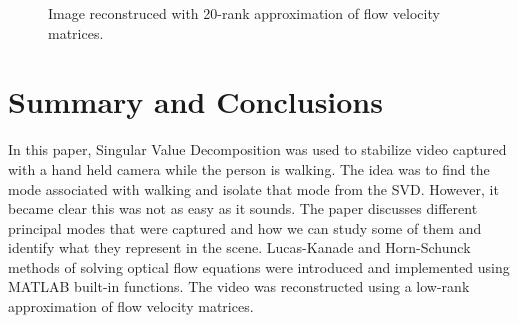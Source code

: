 \documentclass{article}
\begin{document}
\begin{figure}[!t]
\centering
\hspace{2mm} %
\hspace{15mm} %
\caption{Image reconstruced with 20-rank approximation of flow velocity matrices.}
\label{fig:reconstructed}
\end{figure}


\section{Summary and Conclusions}
In this paper, Singular Value Decomposition was used to stabilize video captured with a hand held camera while the person is walking. The idea was to find the mode associated with walking and isolate that mode from the SVD. However, it became clear this was not as easy as it sounds. The paper discusses different principal modes that were captured and how we can study some of them and identify what they represent in the scene. Lucas-Kanade and Horn-Schunck methods of solving optical flow equations were introduced and implemented using MATLAB built-in functions. The video was reconstructed using a low-rank approximation of flow velocity matrices.
\end{document}
